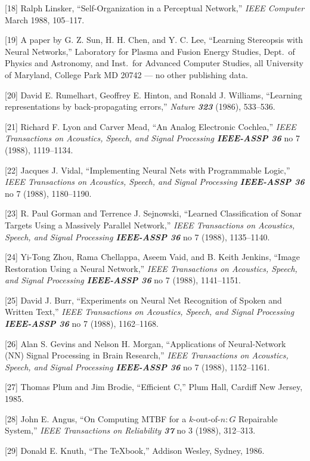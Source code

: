 \documentclass[12pt]{report}
\begin{document}
[18] Ralph Linsker, ``Self-Organization in a Perceptual Network,'' {\sl
IEEE Computer} March 1988, 105--117.

[19] A paper by G. Z. Sun, H. H. Chen, and Y. C. Lee, ``Learning 
Stereopsis with Neural Networks,'' Laboratory for Plasma and Fusion 
Energy Studies, Dept.\ of Physics and Astronomy, 
and Inst.\ for Advanced Computer
Studies, all University of Maryland, College Park MD 20742 --- no other
publishing data.

[20] David E. Rumelhart, Geoffrey E. Hinton, and Ronald J. Williams,
``Learning representations by back-propagating errors,'' {\sl Nature
\bf323} (1986), 533--536.

[21] Richard F. Lyon and Carver Mead, ``An Analog Electronic
Cochlea,'' {\sl IEEE Transactions on Acoustics, Speech, and Signal
Processing \bf IEEE-ASSP 36} no 7 (1988), 1119--1134.

[22] Jacques J. Vidal, ``Implementing Neural Nets with Programmable
Logic,'' {\sl IEEE Transactions on Acoustics, Speech, and Signal
Processing \bf IEEE-ASSP 36} no 7 (1988), 1180--1190.

[23] R. Paul Gorman and Terrence J. Sejnowski, ``Learned
Classification of Sonar Targets Using a Massively Parallel
Network,'' {\sl IEEE Transactions on Acoustics, Speech, and Signal
Processing \bf IEEE-ASSP 36} no 7 (1988), 1135--1140.

[24] Yi-Tong Zhou, Rama Chellappa, Aseem Vaid, and B. Keith Jenkins,
``Image Restoration Using a Neural Network,'' 
{\sl IEEE Transactions on Acoustics, Speech, and Signal
Processing \bf IEEE-ASSP 36} no 7 (1988), 1141--1151.

[25] David J. Burr, ``Experiments on Neural Net Recognition of
Spoken and Written Text,''
{\sl IEEE Transactions on Acoustics, Speech, and Signal
Processing \bf IEEE-ASSP 36} no 7 (1988), 1162--1168.

[26] Alan S. Gevins and Nelson H. Morgan, ``Applications of
Neural-Network (NN) Signal Processing in Brain Research,''
{\sl IEEE Transactions on Acoustics, Speech, and Signal
Processing \bf IEEE-ASSP 36} no 7 (1988), 1152--1161.

[27] Thomas Plum and Jim Brodie, ``Efficient C,'' Plum Hall, Cardiff
New Jersey, 1985.

[28] John E. Angus, ``On Computing MTBF for a $k$-out-of-$n:G$
Repairable System,''
{\sl IEEE Transactions on Reliability \bf 37} no 3 (1988), 312--313.

[29] Donald E. Knuth, ``The \TeX book,'' Addison Wesley, Sydney,
1986.
\end{document}
